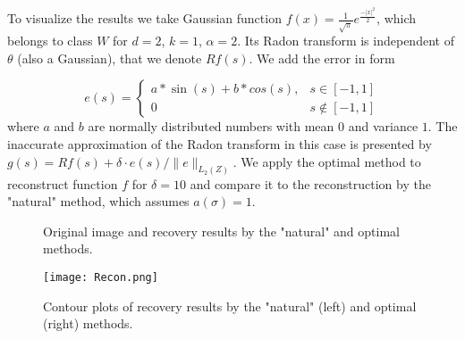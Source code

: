 \documentclass[12pt]{iopart}
\begin{document}
	
	To visualize the results we take Gaussian function $f(x)=\frac{1}{\sqrt{\pi}}e^\frac{-|x|^2}{2}$, which belongs to class $W$ for $d=2$, $k=1$, $\alpha = 2$. Its Radon transform is independent of $\theta$ (also a Gaussian), that we denote $Rf(s)$. We add the error in form 
	
	$$e(s) = \begin{cases}
a*\sin(s)+b*cos(s), & s\in[-1,1] \\
0 & s\notin[-1,1]
\end{cases}
$$
where $a$ and $b$ are normally distributed numbers with mean $0$ and variance $1$. The inaccurate approximation of the Radon transform in this case is presented by $g(s)=Rf(s)+\delta \cdot e(s)/\|e\|_{L_2(Z)}$. We apply the optimal method to reconstruct function $f$ for $\delta=10$ and compare it to the reconstruction by the "natural" method, which assumes $a(\sigma)=1$.

	\begin{figure}[h]
		\caption{Original image and recovery results by the "natural" and optimal methods.}
		\label{some example}
	\end{figure}
	
	\begin{figure}[h]
		{\texttt{[image: Recon.png]}}
		\caption{Contour plots of recovery results by the "natural" (left) and optimal (right) methods.}
		\label{some example}
	\end{figure}
	
	
\end{document}
